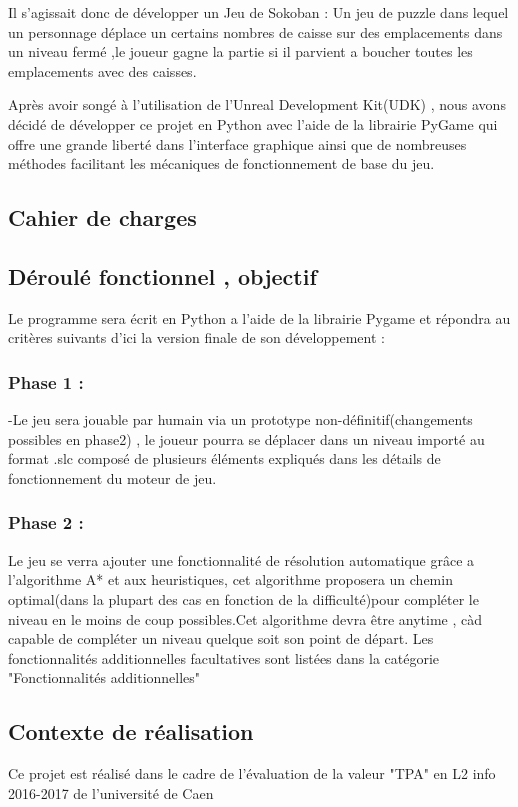 \documentclass{article}
\begin{document}
	Il s'agissait donc de développer un Jeu de Sokoban : Un jeu de puzzle dans lequel un personnage déplace un certains nombres de caisse sur des emplacements dans un niveau fermé ,le joueur gagne la partie si il parvient a boucher toutes les emplacements avec des caisses.
	
	Après avoir songé à l'utilisation de l'Unreal Development Kit(UDK) , nous avons décidé de développer ce projet en Python avec l'aide de la librairie PyGame qui offre une grande liberté dans l'interface graphique ainsi que de nombreuses méthodes facilitant les mécaniques de fonctionnement de base du jeu. 
	\newpage
	\begin{center}
	\section{Cahier de charges}
	\end{center}
	\vspace{1cm}
		\subsection{Déroulé fonctionnel , objectif}
		Le programme sera écrit en Python a l’aide de la librairie Pygame et répondra
au critères suivants d’ici la version finale de son développement :
			\subsubsection{Phase 1 :}
			-Le jeu sera jouable par humain via un prototype non-définitif(changements
possibles en phase2) , le joueur pourra se déplacer dans un niveau importé
au format .slc composé de plusieurs éléments expliqués dans les détails de fonctionnement du moteur de jeu.
			\subsubsection{Phase 2 :}
			Le jeu se verra ajouter une fonctionnalité de résolution automatique grâce
a l’algorithme A* et aux heuristiques, cet algorithme proposera un chemin optimal(dans
la plupart des cas en fonction de la difficulté)pour compléter le niveau
en le moins de coup possibles.Cet algorithme devra être anytime , càd capable
de compléter un niveau quelque soit son point de départ.
Les fonctionnalités additionnelles facultatives sont listées dans la catégorie
"Fonctionnalités additionnelles"
		\subsection{Contexte de réalisation}
		Ce projet est réalisé dans le cadre de l’évaluation de la valeur "TPA" en L2
info 2016-2017 de l’université de Caen
\end{document}
